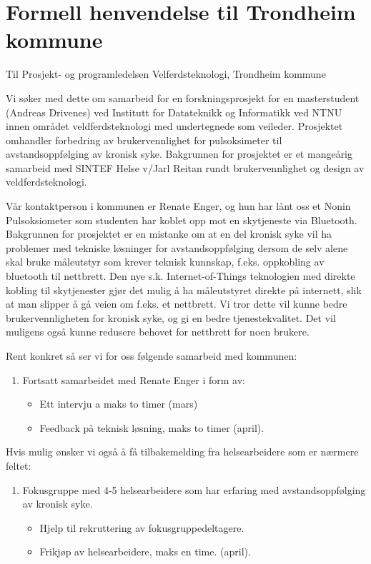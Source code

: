 \chapter{Formell henvendelse til Trondheim kommune}
\label{appendix:formell}
Til Prosjekt- og programledelsen Velferdsteknologi, Trondheim kommune

Vi søker med dette om samarbeid for en forskningsprosjekt for en masterstudent (Andreas Drivenes) ved Institutt for Datateknikk og Informatikk ved
NTNU innen området veldferdsteknologi med undertegnede som veileder. Prosjektet omhandler forbedring av brukervennlighet for pulsoksimeter til
avstandsoppfølging av kronisk syke. Bakgrunnen for prosjektet er et mangeårig samarbeid med SINTEF Helse v/Jarl Reitan rundt brukervennlighet og
design av veldferdsteknologi.

Vår kontaktperson i kommunen er Renate Enger, og hun har lånt oss et Nonin Pulsoksiometer som studenten har koblet opp mot en skytjeneste via
Bluetooth. Bakgrunnen for prosjektet er en mistanke om at en del kronisk syke vil ha problemer med tekniske løsninger for avstandsoppfølging dersom
de selv alene skal bruke måleutstyr som krever teknisk kunnskap, f.eks. oppkobling av bluetooth til nettbrett. Den nye s.k. Internet-of-Things
teknologien med direkte kobling til skytjenester gjør det mulig å ha måleutstyret direkte på internett, slik at man slipper å gå veien om f.eks. et
nettbrett. Vi tror dette vil kunne bedre brukervennligheten for kronisk syke, og gi en bedre tjenestekvalitet. Det vil muligens også kunne redusere
behovet for nettbrett for noen brukere.

Rent konkret så ser vi for oss følgende samarbeid med kommunen:

\begin{enumerate}
\def\labelenumi{\arabic{enumi}.}
\tightlist
\item
  Fortsatt samarbeidet med Renate Enger i form av:

  \begin{itemize}
  \tightlist
  \item
    Ett intervju a maks to timer (mars)
  \item
    Feedback på teknisk løsning, maks to timer (april).
  \end{itemize}
\end{enumerate}

Hvis mulig ønsker vi også å få tilbakemelding fra helsearbeidere som er
nærmere feltet:

\begin{enumerate}
\def\labelenumi{\arabic{enumi}.}
\setcounter{enumi}{1}
\tightlist
\item
  Fokusgruppe med 4-5 helsearbeidere som har erfaring med
  avstandsoppfølging av kronisk syke.

  \begin{itemize}
  \tightlist
  \item
    Hjelp til rekruttering av fokusgruppedeltagere.
  \item
    Frikjøp av helsearbeidere, maks en time. (april).
  \end{itemize}
\end{enumerate}

